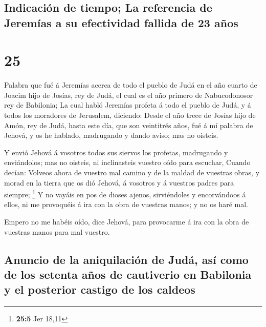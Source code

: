 \hypertarget{indicaciuxf3n-de-tiempo-la-referencia-de-jeremuxedas-a-su-efectividad-fallida-de-23-auxf1os}{%
\subsection{Indicación de tiempo; La referencia de Jeremías a su
efectividad fallida de 23
años}\label{indicaciuxf3n-de-tiempo-la-referencia-de-jeremuxedas-a-su-efectividad-fallida-de-23-auxf1os}}

\hypertarget{section-24}{%
\section{25}\label{section-24}}

 Palabra que fué á Jeremías acerca de todo el pueblo de Judá
en el año cuarto de Joacim hijo de Josías, rey de Judá, el cual es el
año primero de Nabucodonosor rey de Babilonia;  La cual
habló Jeremías profeta á todo el pueblo de Judá, y á todos los moradores
de Jerusalem, diciendo:  Desde el año trece de Josías hijo
de Amón, rey de Judá, hasta este día, que son veintitrés años, fué á mí
palabra de Jehová, y os he hablado, madrugando y dando aviso; mas no
oisteis.

 Y envió Jehová á vosotros todos sus siervos los profetas,
madrugando y enviándolos; mas no oisteis, ni inclinasteis vuestro oído
para escuchar,  Cuando decían: Volveos ahora de vuestro mal
camino y de la maldad de vuestras obras, y morad en la tierra que os dió
Jehová, á vosotros y á vuestros padres para siempre; \footnote{\textbf{25:5}
  Jer 18,11}  Y no vayáis en pos de dioses ajenos,
sirviéndoles y encorvándoos á ellos, ni me provoquéis á ira con la obra
de vuestras manos; y no os haré mal.

 Empero no me habéis oído, dice Jehová, para provocarme á
ira con la obra de vuestras manos para mal vuestro.

\hypertarget{anuncio-de-la-aniquilaciuxf3n-de-juduxe1-asuxed-como-de-los-setenta-auxf1os-de-cautiverio-en-babilonia-y-el-posterior-castigo-de-los-caldeos}{%
\subsection{Anuncio de la aniquilación de Judá, así como de los setenta
años de cautiverio en Babilonia y el posterior castigo de los
caldeos}\label{anuncio-de-la-aniquilaciuxf3n-de-juduxe1-asuxed-como-de-los-setenta-auxf1os-de-cautiverio-en-babilonia-y-el-posterior-castigo-de-los-caldeos}}

